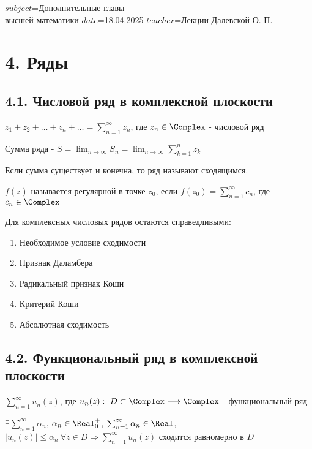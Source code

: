 $subject$=Дополнительные главы \\ высшей математики
$date$=18.04.2025
$teacher$=Лекции Далевской О. П.


\section{4. Ряды}

\subsection{4.1. Числовой ряд в комплексной плоскости}

 $z_1 + z_2 + \dots + z_n + \dots = \sum_{n = 1}^\infty z_n$, где $z_n \in \Complex$ - числовой ряд

 Сумма ряда - $S = \lim_{n \to \infty} S_n = \lim_{n \to \infty} \sum_{k = 1}^n z_k$

Если сумма существует и конечна, то ряд называют сходящимся. 

\Def $f(z)$ называется регулярной в точке $z_0$, если $f(z_0) = \sum_{n = 1}^\infty c_n$, где $c_n \in \Complex$

\Nota Для комплексных числовых рядов остаются справедливыми:

\begin{enumerate}
    \item Необходимое условие сходимости
    \item Признак Даламбера
    \item Радикальный признак Коши
    \item Критерий Коши
    \item Абсолютная сходимость
\end{enumerate}

\subsection{4.2. Функциональный ряд в комплексной плоскости}

\Def $\sum_{n = 1}^\infty u_n(z)$, где $u_n(z) : \ D \subset \Complex \longrightarrow \Complex$ - функциональный ряд

\begin{MyTheorem}

    $\exists \sum_{n = 1}^\infty \alpha_n$, $\alpha_n \in \Real_0^+$, $\sum_{n = 1}^\infty \alpha_n \in \Real$,
    $|u_n(z)| \leq \alpha_n \ \forall z \in D \Longrightarrow \sum_{n = 1}^\infty u_n(z)$ сходится равномерно в $D$
\end{MyTheorem}

